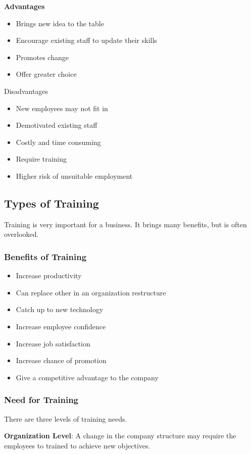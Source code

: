 \documentclass{standalone}
\begin{document}
\textbf{Advantages}\\
\begin{itemize}
	\item Brings new idea to the table
	\item Encourage existing staff to update their skills
	\item Promotes change
	\item Offer greater choice
\end{itemize}

Disadvantages\\
\begin{itemize}
	\item New employees may not fit in
	\item Demotivated existing staff
	\item Costly and time consuming
	\item Require training
	\item Higher risk of unsuitable employment
\end{itemize}

\subsection{Types of Training}
Training is very important for a business.
It brings many benefits, but is often overlooked.

\subsubsection{Benefits of Training}
\begin{itemize}
	\item Increase productivity
	\item Can replace other in an organization restructure
	\item Catch up to new technology
	\item Increase employee confidence
	\item Increase job satisfaction
	\item Increase chance of promotion
	\item Give a competitive advantage to the company
\end{itemize}

\subsubsection{Need for Training}
There are three levels of training needs.

\textbf{Organization Level}: A change in the company structure may require the employees to trained to achieve new objectives.
\end{document}
